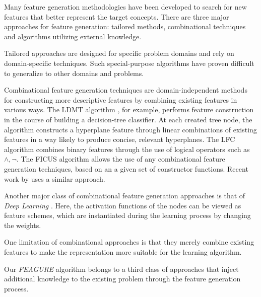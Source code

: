 \documentclass{article}
\theoremstyle{definition}
\begin{document}
Many feature generation methodologies have been developed to search for new features that better represent the target concepts. There are three major approaches for feature generation: tailored methods, combinational techniques and algorithms utilizing external knowledge.

Tailored approaches \citep{sutton1991learning,hirsh1994bootstrapping} are designed for specific problem domains and rely on domain-specific techniques. %
Such special-purpose algorithms %
 have proven difficult to generalize to other domains and problems.

Combinational feature generation techniques are domain-independent methods for constructing more descriptive features by combining existing features in various ways. The LDMT algorithm \citep{utgo1991linear}, for example, performs feature construction in the course of building a decision-tree classifier. At each created tree node, the algorithm constructs a hyperplane feature through linear combinations of existing features in a way likely to produce concise, relevant hyperplanes. The LFC algorithm \citep{ragavan1993complex} combines binary features through the use of logical operators such as $\land ,\lnot$.
The FICUS algorithm \citep{markovitch2002feature} allows the use of any combinational feature generation techniques, based on an a given set of constructor functions. Recent work by \cite{katz2016explorekit} uses a similar approach.

Another major class of combinational feature generation approaches is that of \emph{Deep Learning} \citep{rumelhart1986learning,lecun1998gradient}. Here, the  activation functions of the nodes can be viewed as feature schemes, which are instantiated during the learning process by changing the weights.

One limitation of combinational approaches is that they merely combine existing features to make the representation more suitable for the 
learning algorithm. 

Our \emph{FEAGURE} algorithm belongs to a third class of approaches that inject additional knowledge to the existing problem through the feature generation process.
	
\end{document}
